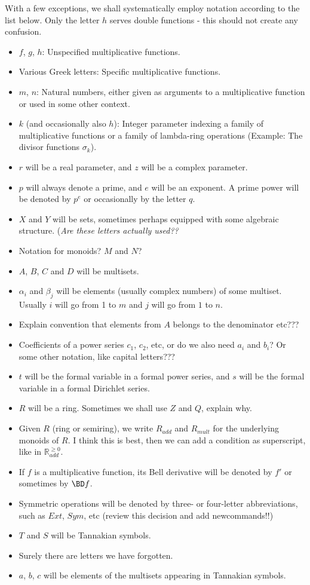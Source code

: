 \documentclass[a4paper]{article}
\begin{document}
With a few exceptions, we shall systematically employ notation according to the list below. Only the letter $h$ serves double functions - this should not create any confusion.
\begin{itemize}
\item $f$, $g$, $h$: Unspecified multiplicative functions.
\item Various Greek letters: Specific multiplicative functions.
\item $m$, $n$: Natural numbers, either given as arguments to a multiplicative function or used in some other context.
\item $k$ (and occasionally also $h$): Integer parameter indexing a family of multiplicative functions or a family of lambda-ring operations (Example: The divisor functions $\sigma_k$).
\item $r$ will be a real parameter, and $z$ will be a complex parameter.
\item $p$ will always denote a prime, and $e$ will be an exponent. A prime power will be denoted by $p^e$ or occasionally by the letter $q$.
\item $X$ and $Y$ will be sets, sometimes perhaps equipped with some algebraic structure. (\emph{Are these letters actually used??}
\item Notation for monoids? $M$ and $N$?
\item $A$, $B$, $C$ and $D$ will be multisets.
\item $\alpha_i$ and $\beta_j$ will be elements (usually complex numbers) of some multiset. Usually $i$ will go from 1 to $m$ and $j$ will go from $1$ to $n$.
\item Explain convention that elements from $A$ belongs to the denominator etc???
\item Coefficients of a power series $c_1$, $c_2$, etc, or do we also need $a_i$ and $b_i$? Or some other notation, like capital letters???
\item $t$ will be the formal variable in a formal power series, and $s$ will be the formal variable in a formal Dirichlet series.
\item $R$ will be a ring. Sometimes we shall use $Z$ and $Q$, explain why.
\item Given $R$ (ring or semiring), we write $R_{add}$ and $R_{mult}$ for the underlying monoids of $R$. I think this is best, then we can add a condition as superscript, like in $\mathbb{R}_{add}^{\geq 0}$.
\item If $f$ is a multiplicative function, its Bell derivative will be denoted by $f'$ or sometimes by $\BD f$. 
\item Symmetric operations will be denoted by three- or four-letter abbreviations, such as $Ext$, $Sym$, etc (review this decision and add newcommands!!)
\item $T$ and $S$ will be Tannakian symbols.
\item Surely there are letters we have forgotten. 
\item $a$, $b$, $c$ will be elements of the multisets appearing in Tannakian symbols.
\end{itemize}
\end{document}
